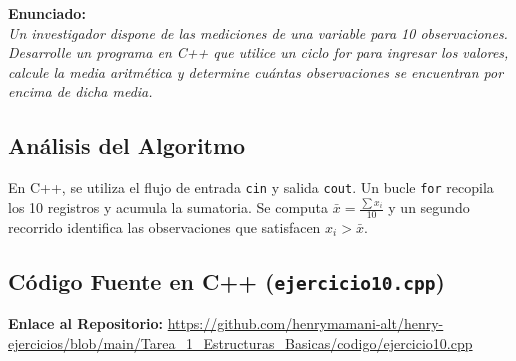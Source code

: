 \documentclass[12pt]{article}
\begin{document}
\noindent\textbf{Enunciado:}\\
\textit{Un investigador dispone de las mediciones de una variable para 10 observaciones. Desarrolle un programa en C++ que utilice un ciclo for para ingresar los valores, calcule la media aritmética y determine cuántas observaciones se encuentran por encima de dicha media.}

\subsection*{Análisis del Algoritmo}
En C++, se utiliza el flujo de entrada \texttt{cin} y salida \texttt{cout}. Un bucle \texttt{for} recopila los 10 registros y acumula la sumatoria. Se computa $\bar{x} = \frac{\sum x_i}{10}$ y un segundo recorrido identifica las observaciones que satisfacen $x_i > \bar{x}$.

\subsection*{Código Fuente en C++ (\texttt{ejercicio10.cpp})}
\noindent\textbf{Enlace al Repositorio:} \url{https://github.com/henrymamani-alt/henry-ejercicios/blob/main/Tarea_1_Estructuras_Basicas/codigo/ejercicio10.cpp}
\end{document}
